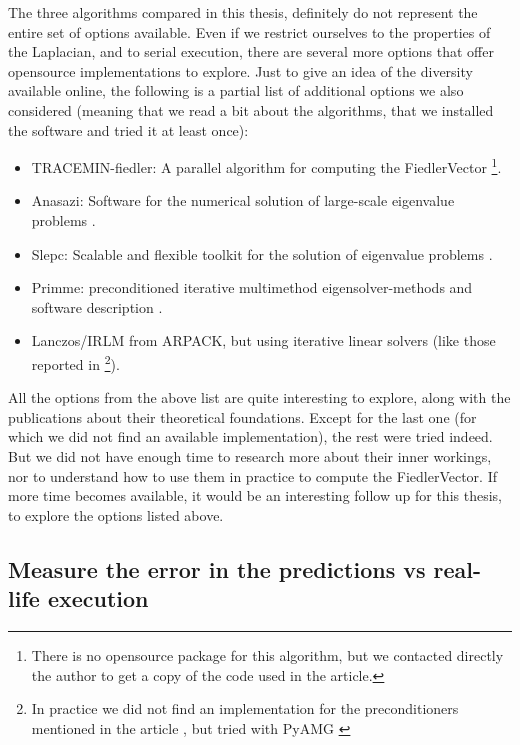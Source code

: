 The three algorithms compared in this thesis, definitely do not represent
the entire set of options available. Even if we restrict ourselves to
the properties of the \gls{Laplacian}, and to serial execution, there are
several more options that offer opensource implementations to
explore. Just to give an idea of the diversity available online, the
following is a partial list of additional options we also considered
(meaning that we read a bit about the algorithms, that we installed
the software and tried it at least once):

\begin{itemize}
  \item TRACEMIN-fiedler: A parallel algorithm for computing the
    \gls{FiedlerVector} \cite{trminfiedler} \footnote{There is no
      opensource package for this algorithm, but we contacted directly
    the author to get a copy of the code used in the article.}.
  \item Anasazi: Software for the numerical solution of large-scale
    eigenvalue problems \cite{anasazi}.
  \item Slepc: Scalable and flexible toolkit for the solution of
    eigenvalue problems \cite{slepc}.
  \item Primme: preconditioned iterative multimethod
    eigensolver-methods and software description \cite{primme}.
  \item Lanczos/\gls{IRLM} from ARPACK, but using iterative linear solvers
    (like those reported in \cite{martinez16} \footnote{In practice we
  did not find an implementation for the preconditioners mentioned in
  the article \cite{martinez16}, but tried with PyAMG \cite{pyamg}}). 
\end{itemize}

All the options from the above list are quite interesting to explore, 
along with the publications about their theoretical
foundations. Except for the last one (for which we did not find an
available implementation), the rest were tried indeed. But we did
not have enough time to research more about their inner workings, nor
to understand how to use them in practice to compute the
\gls{FiedlerVector}. If more time becomes available, it would be an interesting
follow up for this thesis, to explore the options listed above.

\subsection{Measure the error in the predictions vs real-life execution}

